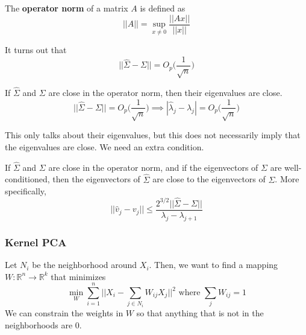     \begin{definition}
      The \textbf{operator norm} of a matrix $A$ is defined as 
      \begin{equation}
        ||A|| = \sup_{x \neq 0} \frac{||Ax||}{||x||} 
      \end{equation}
    \end{definition}

    \begin{lemma}[]
      It turns out that 
      \begin{equation}
        ||\hat{\Sigma} - \Sigma|| = O_p \bigg( \frac{1}{\sqrt{n}} \bigg)
      \end{equation}
    \end{lemma}

    \begin{theorem}
      If $\hat{\Sigma}$ and $\Sigma$ are close in the operator norm, then their eigenvalues are close. 
      \begin{equation}
        ||\hat{\Sigma} - \Sigma|| = O_p \bigg( \frac{1}{\sqrt{n}} \bigg) \implies |\hat{\lambda}_j - \lambda_j| = O_p \bigg( \frac{1}{\sqrt{n}} \bigg) 
      \end{equation}
    \end{theorem}

    This only talks about their eigenvalues, but this does not necessarily imply that the eigenvalues are close. We need an extra condition. 

    \begin{theorem}
      If $\hat{\Sigma}$ and $\Sigma$ are close in the operator norm, and if the eigenvectors of $\Sigma$ are well-conditioned, then the eigenvectors of $\hat{\Sigma}$ are close to the eigenvectors of $\Sigma$. More specifically, 
      \begin{equation}
        ||\hat{v}_j - v_j|| \leq \frac{2^{3/2} ||\hat{\Sigma} - \Sigma||}{\lambda_j - \lambda_{j+1}}
      \end{equation}
    \end{theorem}

    \subsubsection{Kernel PCA}

      \begin{definition}
        Let $N_i$ be the neighborhood around $X_i$. Then, we want to find a mapping $W: \mathbb{R}^n \rightarrow \mathbb{R}^k$ that minimizes 
        \begin{equation}
          \min_{W} \sum_{i=1}^n \bigg| \bigg| X_i - \sum_{j \in N_i} W_{ij} X_j \bigg| \bigg|^2 \text{ where } \sum_{j} W_{ij} = 1
        \end{equation}
        We can constrain the weights in $W$ so that anything that is not in the neighborhoods are $0$. 
      \end{definition}

